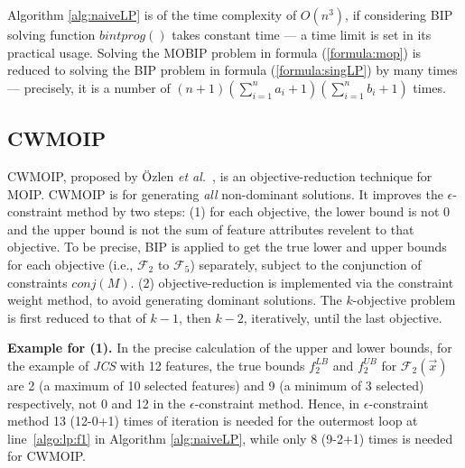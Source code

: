 Algorithm \ref{alg:naiveLP} is of the time complexity of $O(n^3)$, if considering BIP solving function $bintprog()$ takes constant time --- a time limit is set in its practical usage. Solving the MOBIP problem in formula (\ref{formula:mop}) is reduced to solving the BIP problem in formula (\ref{formula:singLP}) by many times --- precisely, it is a number of $(n+1)  ({\sum\nolimits_{i=1}^{n}a_i}+1)({\sum\nolimits_{i=1}^{n}b_i}+1)$ times.



\subsection{CWMOIP}
CWMOIP, proposed by  \"{O}zlen \emph{et al.}~\cite{DBLP:journals/eor/OzlenA09}, is an objective-reduction technique for MOIP. CWMOIP is for generating \emph{all} non-dominant solutions.
It improves the $\epsilon$-constraint method by two steps: (1) for each objective, the lower bound is not 0 and the upper bound is not the sum of feature attributes revelent to that objective. To be precise, BIP is applied to get the true lower and upper bounds for each objective (i.e., $\mathcal{F}_2$ to $\mathcal{F}_5$) separately, subject to the  conjunction of constraints $conj(M)$. (2) objective-reduction is implemented via the constraint weight method, to avoid generating dominant solutions. The $k$-objective problem is first reduced to that of $k-1$, then $k-2$, iteratively, until the last objective.

\noindent\textbf{Example for (1).} In the precise calculation of the upper and lower bounds, for the example of \emph{JCS} with 12 features, the true bounds $f^{LB}_2$ and $f^{UB}_2$ for $\mathcal{F}_2(\vec x)$ are 2 (a maximum of 10 selected  features) and 9 (a minimum of 3 selected) respectively, not 0 and 12 in the $\epsilon$-constraint method. Hence, in $\epsilon$-constraint method 13 (12-0+1) times of iteration is needed for the outermost loop at line~\ref{algo:lp:f1} in Algorithm \ref{alg:naiveLP}, while  only 8 (9-2+1) times is needed for CWMOIP.



